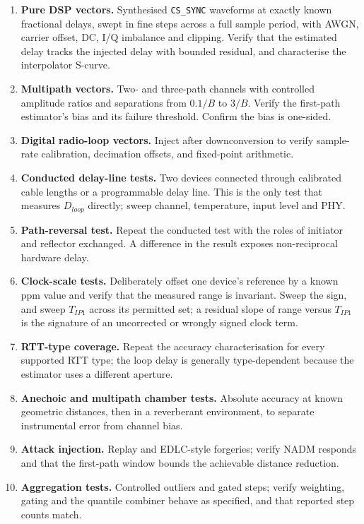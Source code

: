 \documentclass[11pt,a4paper]{article}
\newcommand{\NADM}{\mathrm{NADM}}
\newcommand{\Tip}{T_{IP1}}
\newcommand{\code}[1]{\texttt{\small #1}}
\begin{document}
\begin{enumerate}[leftmargin=1.7em,itemsep=2pt]
  \item \textbf{Pure DSP vectors.} Synthesised \code{CS\_SYNC} waveforms at exactly known fractional
    delays, swept in fine steps across a full sample period, with AWGN, carrier offset, DC, I/Q
    imbalance and clipping. Verify that the estimated delay tracks the injected delay with bounded
    residual, and characterise the interpolator S-curve.
  \item \textbf{Multipath vectors.} Two- and three-path channels with controlled amplitude ratios
    and separations from $0.1/B$ to $3/B$. Verify the first-path estimator's bias and its failure
    threshold. Confirm the bias is one-sided.
  \item \textbf{Digital radio-loop vectors.} Inject after downconversion to verify sample-rate
    calibration, decimation offsets, and fixed-point arithmetic.
  \item \textbf{Conducted delay-line tests.} Two devices connected through calibrated cable lengths
    or a programmable delay line. This is the only test that measures $D_{loop}$ directly; sweep
    channel, temperature, input level and PHY.
  \item \textbf{Path-reversal test.} Repeat the conducted test with the roles of initiator and
    reflector exchanged. A difference in the result exposes non-reciprocal hardware delay.
  \item \textbf{Clock-scale tests.} Deliberately offset one device's reference by a known ppm value
    and verify that the measured range is invariant. Sweep the sign, and sweep $\Tip$ across its
    permitted set; a residual slope of range versus $\Tip$ is the signature of an uncorrected or
    wrongly signed clock term.
  \item \textbf{RTT-type coverage.} Repeat the accuracy characterisation for every supported RTT
    type; the loop delay is generally type-dependent because the estimator uses a different aperture.
  \item \textbf{Anechoic and multipath chamber tests.} Absolute accuracy at known geometric
    distances, then in a reverberant environment, to separate instrumental error from channel bias.
  \item \textbf{Attack injection.} Replay and EDLC-style forgeries; verify $\NADM$ responds and that
    the first-path window bounds the achievable distance reduction.
  \item \textbf{Aggregation tests.} Controlled outliers and gated steps; verify weighting, gating and
    the quantile combiner behave as specified, and that reported step counts match.
\end{enumerate}
\end{document}
